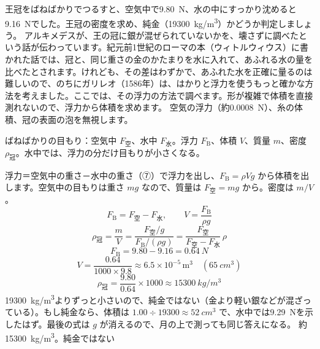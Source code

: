 \begin{phreidai}[アルキメデスの王冠]
\label{ph:力-12:ex11}王冠をばねばかりでつるすと、空気中で\qty{9.80}{N}、水の中にすっかり沈めると\qty{9.16}{N}でした。王冠の密度を求め、純金（\qty{19300}{kg/m^3}）かどうか判定しましょう。
\phbamen
アルキメデスが、王の冠に銀が混ぜられていないかを、壊さずに調べたという話が伝わっています。紀元前1世紀のローマの本（ウィトルウィウス）に書かれた話では、冠と、同じ重さの金のかたまりを水に入れて、あふれる水の量を比べたとされます。けれども、その差はわずかで、あふれた水を正確に量るのは難しいので、のちにガリレオ（1586年）は、はかりと浮力を使うもっと確かな方法を考えました。ここでは、その浮力の方法で調べます。形が複雑で体積を直接測れないので、浮力から体積を求めます。
\phmushi
空気の浮力（約\qty{0.0008}{N}）、糸の体積、冠の表面の泡を無視します。
\phzu
\noindent\begin{minipage}[c]{0.46\linewidth}\centering
{}
\end{minipage}\hfill
\begin{minipage}[c]{0.51\linewidth}\raggedright
ばねばかりの目もり：空気中 $F_{\text{空}}$、水中 $F_{\text{水}}$。浮力 $F_{\mathrm{B}}$、体積 $V$、質量 $m$、密度 $\rho_{\text{冠}}$。水中では、浮力の分だけ目もりが小さくなる。
\end{minipage}
\phriyu
浮力＝空気中の重さ－水中の重さ（⑦）で浮力を出し、$F_{\mathrm{B}}=\rho Vg$ から体積を出します。空気中の目もりは重さ $mg$ なので、質量は $F_{\text{空}}=mg$ から。密度は $m/V$。
\phtateru
\[ F_{\mathrm{B}}=F_{\text{空}}-F_{\text{水}},\qquad V=\frac{F_{\mathrm{B}}}{\rho g} \]
\[ \rho_{\text{冠}}=\frac{m}{V}=\frac{F_{\text{空}}/g}{F_{\mathrm{B}}/(\rho g)}=\frac{F_{\text{空}}}{F_{\text{空}}-F_{\text{水}}}\,\rho \]
\phtoku
\[ F_{\mathrm{B}}=9.80-9.16=\qty{0.64}{N} \]
\[ V=\frac{0.64}{1000\times9.8}\approx6.5\times10^{-5}\,\mathrm{m^3}\quad(\qty{65}{cm^3}) \]
\[ \rho_{\text{冠}}=\frac{9.80}{0.64}\times1000\approx\qty{15300}{kg/m^3} \]
\phtashikame
\qty{19300}{kg/m^3}よりずっと小さいので、純金ではない（金より軽い銀などが混ざっている）。もし純金なら、体積は $1.00\div\num{19300}\approx\qty{52}{cm^3}$ で、水中では\qty{9.29}{N}を示したはず。最後の式は $g$ が消えるので、月の上で測っても同じ答えになる。
\kotae 約\qty{15300}{kg/m^3}。純金ではない
\end{phreidai}
